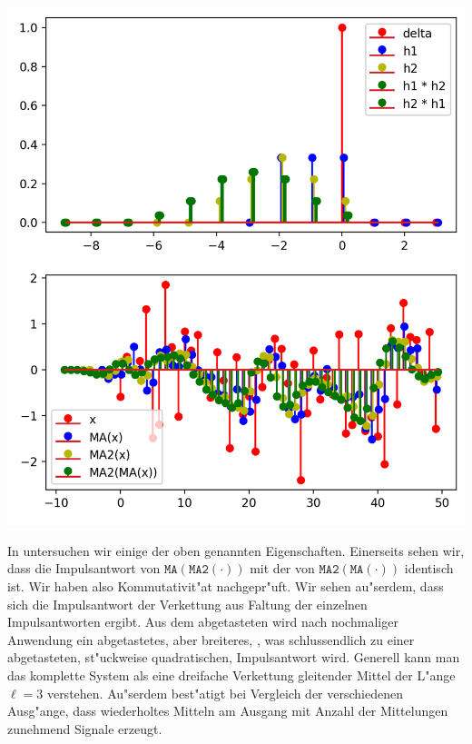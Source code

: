 \begin{listing}
    \noindent
    \begin{minipage}{0.40\textwidth}
        \strut\vspace*{-\baselineskip}\newline
        \inputminted[firstline=10,lastline=33]{python3}{code/ramp_ma.py}
    \end{minipage}%
    \begin{minipage}{0.59\textwidth}
        \strut\vspace*{-\baselineskip}\newline
        \includegraphics[width=\textwidth]{code/ramp_ma.png}
    \end{minipage}
    \label{py:ramp_ma}
\end{listing}
%
In  untersuchen wir einige der oben genannten Eigenschaften.
Einerseits sehen wir, dass die Impulsantwort von $\texttt{MA}(\texttt{MA2}(\cdot))$ mit der von $\texttt{MA2}(\texttt{MA}(\cdot))$ identisch ist. Wir haben also Kommutativit"at nachgepr"uft.
Wir sehen au"serdem, dass sich die Impulsantwort der Verkettung aus Faltung der einzelnen Impulsantworten ergibt.
Aus dem abgetasteten  wird nach nochmaliger Anwendung ein abgetastetes, aber breiteres, , was schlussendlich zu einer abgetasteten, st"uckweise quadratischen, Impulsantwort wird.
Generell kann man das komplette System als eine dreifache Verkettung gleitender Mittel der L"ange $\ell=3$ verstehen.
Au"serdem best"atigt  bei Vergleich der verschiedenen Ausg"ange, dass wiederholtes Mitteln am Ausgang mit Anzahl der Mittelungen zunehmend  Signale erzeugt.
%
